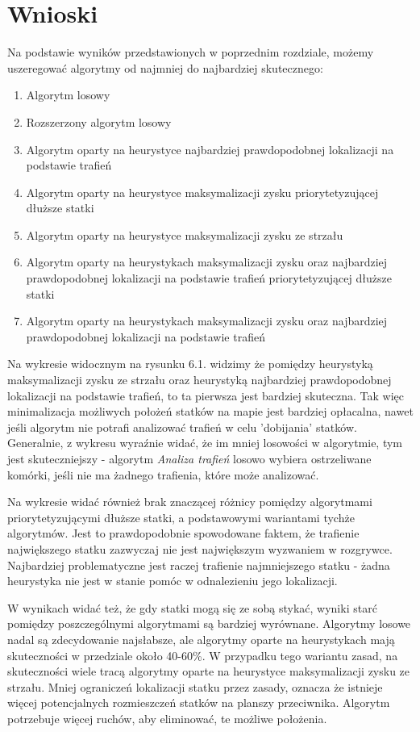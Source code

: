 \newpage %
\section{Wnioski}

Na podstawie wyników przedstawionych w poprzednim rozdziale, możemy uszeregować algorytmy od najmniej do najbardziej skutecznego:\begin{enumerate}
    \item Algorytm losowy
    \item Rozszerzony algorytm losowy
    \item Algorytm oparty na heurystyce najbardziej prawdopodobnej lokalizacji na podstawie trafień
    \item Algorytm oparty na heurystyce maksymalizacji zysku priorytetyzującej dłuższe statki
    \item Algorytm oparty na heurystyce maksymalizacji zysku ze strzału
        \item Algorytm oparty na heurystykach maksymalizacji zysku oraz najbardziej prawdopodobnej lokalizacji na podstawie trafień priorytetyzującej dłuższe statki
    \item Algorytm oparty na heurystykach maksymalizacji zysku oraz najbardziej prawdopodobnej lokalizacji na podstawie trafień
\end{enumerate}

Na wykresie widocznym na rysunku 6.1. widzimy że pomiędzy heurystyką maksymalizacji zysku ze strzału oraz heurystyką najbardziej prawdopodobnej lokalizacji na podstawie trafień, to ta pierwsza jest bardziej skuteczna. Tak więc minimalizacja możliwych położeń statków na mapie jest bardziej opłacalna, nawet jeśli algorytm nie potrafi analizować trafień w celu 'dobijania' statków. Generalnie, z wykresu wyraźnie widać, że im mniej losowości w algorytmie, tym jest skuteczniejszy - algorytm \emph{Analiza trafień} losowo wybiera ostrzeliwane komórki, jeśli nie ma żadnego trafienia, które może analizować.

Na wykresie widać również brak znaczącej różnicy pomiędzy algorytmami priorytetyzującymi dłuższe statki, a podstawowymi wariantami tychże algorytmów. Jest to prawdopodobnie spowodowane faktem, że trafienie największego statku zazwyczaj nie jest największym wyzwaniem w rozgrywce. Najbardziej problematyczne jest raczej trafienie najmniejszego statku - żadna heurystyka nie jest w stanie pomóc w odnalezieniu jego lokalizacji.

W wynikach widać też, że gdy statki mogą się ze sobą stykać, wyniki starć pomiędzy poszczególnymi algorytmami są bardziej wyrównane. Algorytmy losowe nadal są zdecydowanie najsłabsze, ale algorytmy oparte na heurystykach mają skuteczności w przedziale około 40-60\%. W przypadku tego wariantu zasad, na skuteczności wiele tracą algorytmy oparte na heurystyce maksymalizacji zysku ze strzału. Mniej ograniczeń lokalizacji statku przez zasady, oznacza że istnieje więcej potencjalnych rozmieszczeń statków na planszy przeciwnika. Algorytm potrzebuje więcej ruchów, aby eliminować, te możliwe położenia. 

